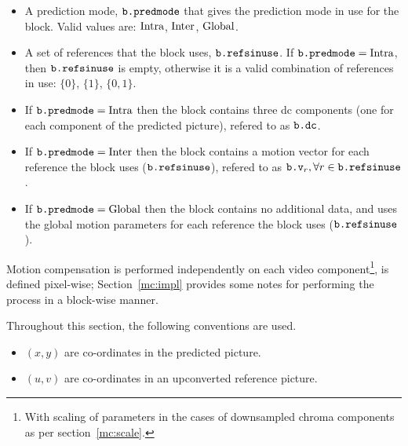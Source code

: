 \begin{itemize}
\begin{itemize}
    \item A prediction mode, $\text{\texttt{b.predmode}}$ that gives the prediction mode
    in use for the block.  Valid values are: $\text{Intra}$, $\text{Inter}$,
    $\text{Global}$.

    \item A set of references that the block uses, $\text{\texttt{b.refsinuse}}$.
    If $\text{\texttt{b.predmode}} = \text{Intra}$, then $\text{\texttt{b.refsinuse}}$ is empty, otherwise
    it is a valid combination of references in use: $\lbrace0\rbrace$,
    $\lbrace1\rbrace$, $\lbrace0,1\rbrace$.

    \item If $\text{\texttt{b.predmode}} = \text{Intra}$ then the block contains three dc
    components (one for each component of the predicted picture),
    refered to as $\text{\texttt{b.dc}}$.

    \item If $\text{\texttt{b.predmode}} = \text{Inter}$ then the block contains a motion
    vector for each reference the block uses ($\text{\texttt{b.refsinuse}}$), refered to
    as $\text{\texttt{b.v}}_r, \forall r \in \text{\texttt{b.refsinuse}}$.

    \item If $\text{\texttt{b.predmode}} = \text{Global}$ then the block contains no
    additional data, and uses the global motion parameters for each
    reference the block uses ($\text{\texttt{b.refsinuse}}$).
  \end{itemize}
\end{itemize}

Motion compensation is performed independently on each video
component\footnote{With scaling of parameters in the cases of
downsampled chroma components as per section~\ref{mc:scale}.}, is
defined pixel-wise; Section~\ref{mc:impl} provides some notes for
performing the process in a block-wise manner.

Throughout this section, the following conventions are used.

\begin{itemize}
\item $(x,y)$ are co-ordinates in the predicted picture.
\item $(u,v)$ are co-ordinates in an upconverted reference picture.
\end{itemize}

\begin{comment}
For each component, motion compensation is effected by forming a
prediction for each pixel within the component and adding it to the
pixel value. Specifically, for luma components, set

The use of OBMC implies that each pixel may fall into between 1 and 4
Prediction Units (), and the prediction value is a weighted combination
of predictions from each prediction unit of which the pixel is a member.
\end{comment}
